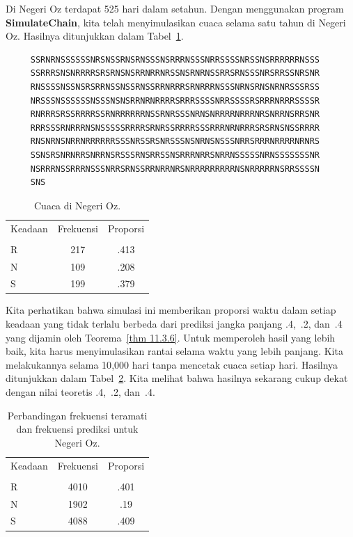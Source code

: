 \begin{example}\label{exam 11.3.2.6}
Di Negeri Oz terdapat 525 hari dalam setahun.
 Dengan menggunakan program {\bf SimulateChain}, kita telah
menyimulasikan cuaca selama satu tahun di Negeri Oz. Hasilnya ditunjukkan dalam
Tabel~\ref{table 11.2}. 

\begin{table}[h]
\centering
\begin{verbatim}
     SSRNRNSSSSSSNRSNSSRNSRNSSSNSRRRNSSSNRRSSSSNRSSNSRRRRRRNSSS 
     SSRRRSNSNRRRRSRSRNSNSRRNRRNRSSNSRNRNSSRRSRNSSSNRSRRSSNRSNR
     RNSSSSNSSNSRSRRNSSNSSRNSSRRNRRRSRNRRRNSSSNRNSRNSNRNRSSSRSS
     NRSSSNSSSSSSNSSSNSNSRRNRNRRRRSRRRSSSSNRRSSSSRSRRRNRRRSSSSR
     RNRRRSRSSRRRRSSRNRRRRRRNSSRNRSSSNRNSNRRRRNRRRNRSNRRNSRRSNR
     RRRSSSRNRRRNSNSSSSSRRRRSRNRSSRRRRSSSRRRNRNRRRSRSRNSNSSRRRR
     RNSNRNSNRRNRRRRRRSSSNRSSRSNRSSSNSNRNSNSSSNRRSRRRNRRRRNRNRS
     SSNSRSNRNRRSNRRNSRSSSRNSRRSSNSRRRNRRSNRRNSSSSSNRNSSSSSSSNR
     NSRRRNSSRRRNSSSNRRSRNSSRRNRRNRSNRRRRRRRRRNSNRRRRRNSRRSSSSN
     SNS
\end{verbatim}
\begin{tabular}{lcc}
Keadaan  &   Frekuensi    &      Proporsi\\
         &                &           \\
R        &        217     &      .413 \\
N        &        109     &      .208 \\
S        &        199     &      .379 \\
\end{tabular}
\caption{Cuaca di Negeri Oz.}
\label{table 11.2}
\end{table}
 
Kita perhatikan bahwa simulasi ini memberikan proporsi waktu dalam setiap
keadaan yang tidak terlalu berbeda dari prediksi jangka panjang .4,~.2,
dan~.4 yang dijamin oleh Teorema~\ref{thm 11.3.6}. Untuk memperoleh hasil yang
lebih baik, kita harus menyimulasikan rantai selama waktu yang lebih panjang.
Kita melakukannya selama 10{,}000 hari tanpa mencetak cuaca setiap hari.
Hasilnya ditunjukkan dalam Tabel~\ref{table 11.3}. Kita melihat bahwa hasilnya
sekarang cukup dekat dengan nilai teoretis .4,~.2, dan~.4.

\begin{table}[h]
\centering
\begin{tabular}{lcc}
Keadaan &   Frekuensi   &     Proporsi\\
      &                &           \\
R     &      4010      &      .401 \\
N     &      1902      &      .19  \\
S     &      4088      &      .409 \\
\end{tabular}
\caption{Perbandingan frekuensi teramati dan frekuensi prediksi untuk Negeri Oz.}
\label{table 11.3}
\end{table}
\end{example}

